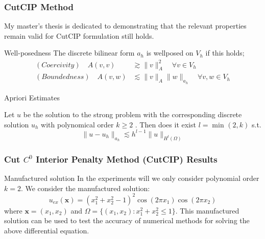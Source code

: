 \begin{frame}
\frametitle{ CutCIP Method}

My master's thesis is dedicated to demonstrating that the relevant properties remain valid for CutCIP formulation still holds.

    \begin{block}{Well-posedness }
         The discrete bilinear form $a_{h}$ is wellposed on $V_{h}$ if this holds; \[
             \begin{split}
                 (Coercivity) \quad  A( v,v) &  \gtrsim  \| v \|_{A }^{ 2 } \quad  \forall v \in  V_{h} \\
            (Boundedness) \quad A( v,w) & \lesssim  \| v \|_{A }^{  }\| w \|_{a_{h} }^{  } \quad  \forall v,w \in  V_{h}
             \end{split}
        \]
    \end{block}

    \begin{block}{Apriori Estimates }

         Let $u$ be the solution to the strong problem with the corresponding discrete solution $u_{h}$ with polynomical order $k\ge 2$ .
        Then does it exist  $l = \min_{} ( 2, k)  $ s.t.
\[
        \| u - u_{h} \|_{a_{h}  }^{  } \lesssim  h^{l-1} \| u \|_{ H^{l} ( \Omega ) }^{  }
\]
    \end{block}
\end{frame}



\begin{frame}
\frametitle{ Cut $C^0$ Interior Penalty Method (CutCIP) Results }


\begin{block}{Manufactured solution}
    In the experiments will we only consider polynomial order $k=2$.
We consider the manufactured solution:
$$
u_{ex}(\mathbf{x}) = \left(x_1^2 + x_2^2 - 1\right)^2 \cos(2\pi x_1) \cos(2\pi x_2)
$$
where $\mathbf{x}=(x_1,x_2)$ and $\Omega=\{(x_1,x_2): x_1^2 + x_2^2 \le  1\}$.
This manufactured solution can be used to test the accuracy of numerical methods for solving the above differential equation.
\end{block}
\end{frame}


